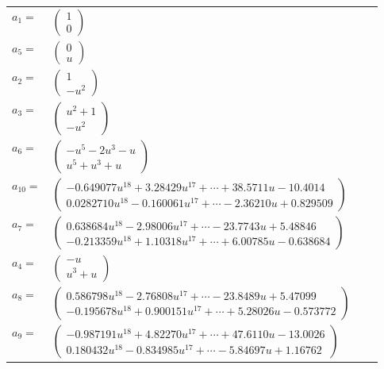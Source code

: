\documentclass[1p]{elsarticle_modified}
\theoremstyle{definition}
\begin{document}
\begin{tabular}{m{7pt} m{180pt} m{7pt} m{180pt} }
\flushright $a_{1}=$&$\begin{pmatrix}1\\0\end{pmatrix}$ \\
\flushright $a_{5}=$&$\begin{pmatrix}0\\u\end{pmatrix}$ \\
\flushright $a_{2}=$&$\begin{pmatrix}1\\- u^2\end{pmatrix}$ \\
\flushright $a_{3}=$&$\begin{pmatrix}u^2+1\\- u^2\end{pmatrix}$ \\
\flushright $a_{6}=$&$\begin{pmatrix}- u^5-2 u^3- u\\u^5+u^3+u\end{pmatrix}$ \\
\flushright $a_{10}=$&$\begin{pmatrix}-0.649077 u^{18}+3.28429 u^{17}+\cdots+38.5711 u-10.4014\\0.0282710 u^{18}-0.160061 u^{17}+\cdots-2.36210 u+0.829509\end{pmatrix}$ \\
\flushright $a_{7}=$&$\begin{pmatrix}0.638684 u^{18}-2.98006 u^{17}+\cdots-23.7743 u+5.48846\\-0.213359 u^{18}+1.10318 u^{17}+\cdots+6.00785 u-0.638684\end{pmatrix}$ \\
\flushright $a_{4}=$&$\begin{pmatrix}- u\\u^3+u\end{pmatrix}$ \\
\flushright $a_{8}=$&$\begin{pmatrix}0.586798 u^{18}-2.76808 u^{17}+\cdots-23.8489 u+5.47099\\-0.195678 u^{18}+0.900151 u^{17}+\cdots+5.28026 u-0.573772\end{pmatrix}$ \\
\flushright $a_{9}=$&$\begin{pmatrix}-0.987191 u^{18}+4.82270 u^{17}+\cdots+47.6110 u-13.0026\\0.180432 u^{18}-0.834985 u^{17}+\cdots-5.84697 u+1.16762\end{pmatrix}$ \\

\end{tabular}
\end{document}
